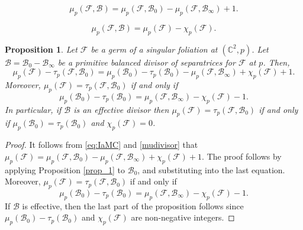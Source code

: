 \documentclass[10pt,a4paper]{amsart}
\newtheorem{proposition}{Proposition}
\newcommand{\B}{\mathcal{B}}
\newcommand{\C}{\mathbb{C}}
\newcommand{\F}{\mathcal{F}}
\begin{document}
\begin{equation}\label{mudivisor}
\mu_{p}(\mathcal{F},\mathcal{B})=\mu_{p}(\mathcal{F},\mathcal{B}_0)-\mu_{p}(\mathcal{F},\mathcal{B}_{\infty})+1.
\end{equation}

    \begin{equation} \label{eq:IaMC}
    \mu_{p}(\mathcal{F},\mathcal B)=\mu_{p}(\mathcal F)-\chi_p(\mathcal{F}).
    \end{equation}

\begin{proposition}\label{iguales}
Let $\F$ be a germ of a singular foliation  at $(\C^2,p)$. Let $\B=\B_0-\B_{\infty}$ be a primitive balanced divisor of separatrices for $\F$ at $p$.  Then,
 \begin{equation*}
 \mu_p(\F)-\tau_p(\F,\B_0)=\mu_p(\B_0)-\tau_p(\B_0)-\mu_p(\F,\B_{\infty})+\chi_p(\F)+1.
 \end{equation*}
 Moreover, $\mu_p(\F)=\tau_p(\F,\B_0)$ if and only if  \[\mu_p(\B_0)-\tau_p(\B_0)=\mu_p(\F,\B_{\infty})-\chi_p(\F)-1.\]
In particular, if $\B$ is an effective divisor then $\mu_p(\F)=\tau_p(\F,\B_0)$ if and only if  $\mu_p(\B_0)=\tau_p(\B_0)$ and $\chi_p(\F)=0$.
\end{proposition}

\begin{proof}
It follows from \eqref{eq:IaMC} and \eqref{mudivisor} that $\mu_{p}(\mathcal F)=\mu_{p}(\mathcal{F},\mathcal{B}_0)-\mu_p(\F,\B_{\infty})+\chi_p(\mathcal{F})+1$. The proof follows by applying Proposition \ref{prop_1} to $\B_0$, and substituting into the last equation.
Moreover, $\mu_p(\F)=\tau_p(\F,\B_0)$ if and only if \[\mu_p(\B_0)-\tau_p(\B_0)=\mu_p(\F,\B_{\infty})-\chi_p(\F)-1.\]
If $\B$ is effective, then the  last part of the proposition follows since $\mu_p(\B_0)-\tau_p(\B_0)$ and $\chi_p(\F)$ are non-negative integers.
\end{proof}
\end{document}
